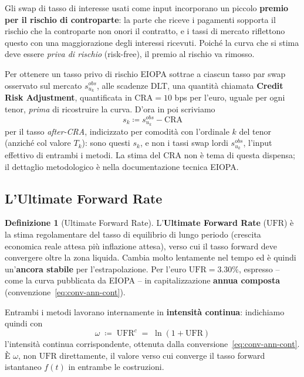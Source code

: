 \documentclass[11pt,a4paper]{article}
\theoremstyle{plain}
\theoremstyle{definition}
\newtheorem{definizione}[teorema]{Definizione}
\theoremstyle{remark}
\newcommand{\UFR}{\mathrm{UFR}}
\newcommand{\CRA}{\mathrm{CRA}}
\newcommand{\defeq}{\coloneqq}
\begin{document}
Gli swap di tasso di interesse usati come input incorporano un piccolo \textbf{premio per il
rischio di controparte}: la parte che riceve i pagamenti sopporta il rischio che la
controparte non onori il contratto, e i tassi di mercato riflettono questo con una
maggiorazione degli interessi ricevuti. Poich\'e la curva che si stima deve essere
\emph{priva di rischio} (risk-free), il premio al rischio va rimosso.

Per ottenere un tasso privo di rischio EIOPA sottrae a ciascun tasso par swap osservato sul
mercato $s^{obs}_{u_k}$, alle scadenze DLT, una quantit\`a chiamata \textbf{Credit Risk
Adjustment}, quantificata in $\CRA = 10$ bps per l'euro, uguale per ogni tenor, \emph{prima}
di ricostruire la curva. D'ora in poi scriviamo
\begin{equation}
  \label{eq:cra-def}
  s_{k} \defeq s^{obs}_{u_k} - \CRA
\end{equation}
per il tasso \emph{after-CRA}, indicizzato per comodit\`a con l'ordinale $k$ del tenor
(anzich\'e col valore $T_k$): sono questi $s_k$, e non i tassi swap lordi $s^{obs}_{u_k}$,
l'input effettivo di entrambi i metodi. La stima del $\CRA$ non \`e tema di questa dispensa;
il dettaglio metodologico \`e nella documentazione tecnica EIOPA.

\subsection{L'Ultimate Forward Rate}
\label{sec:ufr-def}

\begin{definizione}[Ultimate Forward Rate]
\label{def:ufr}
L'\textbf{Ultimate Forward Rate} ($\UFR$) \`e la stima regolamentare del tasso di equilibrio
di lungo periodo (crescita economica reale attesa pi\`u inflazione attesa), verso cui il
tasso forward deve convergere oltre la zona liquida. Cambia molto lentamente nel tempo ed
\`e quindi un'\textbf{ancora stabile} per l'estrapolazione. Per l'euro $\UFR = 3.30\%$,
espresso -- come la curva pubblicata da EIOPA -- in capitalizzazione \textbf{annua composta}
(convenzione~\eqref{eq:conv-ann-cont}).

Entrambi i metodi lavorano internamente in \textbf{intensit\`a continua}: indichiamo quindi
con
\[
  \omega \;\defeq\; \UFR^c \;=\; \ln(1+\UFR)
\]
l'intensit\`a continua corrispondente, ottenuta dalla conversione~\eqref{eq:conv-ann-cont}.
\`E $\omega$, non $\UFR$ direttamente, il valore verso cui converge il tasso forward
istantaneo $f(t)$ in entrambe le costruzioni.
\end{definizione}
\end{document}
